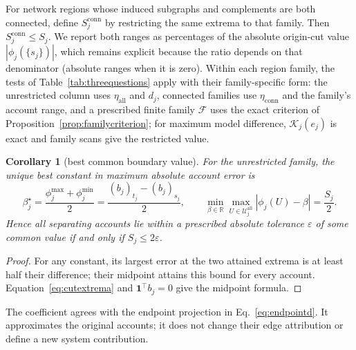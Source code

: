\documentclass[a4paper,fleqn]{cas-sc}
\newtheorem{corollary}[theorem]{Corollary}
\begin{document}
For network regions whose induced subgraphs and complements are both
connected, define $S_j^{\mathrm{conn}}$ by restricting the same extrema to
that family. Then $S_j^{\mathrm{conn}}\le S_j$. We report both
ranges as percentages of the absolute origin-cut value
$|\phi_j(\{s_j\})|$, which remains explicit because the ratio depends
on that denominator (absolute ranges when it is zero). Within each
region family, the tests of Table~\ref{tab:threequestions} apply with
their family-specific form: the unrestricted column uses
$\eta_{\mathrm{all}}$ and $d_j$, connected families use
$\eta_{\mathrm{conn}}$ and the family's account range, and a
prescribed finite family $\mathcal F$ uses the exact criterion of
Proposition~\ref{prop:familycriterion}; for
maximum model difference, $\mathcal K_j(e_j)$ is exact and family
scans give the restricted value.

\begin{corollary}[best common boundary value]\label{cor:approxinterchange}
For the unrestricted family, the unique best constant in maximum absolute
account error is
\[
\beta_j^\star=\frac{\phi_j^{\max}+\phi_j^{\min}}2
=\frac{(b_j)_{t_j}-(b_j)_{s_j}}2,\qquad
\min_{\beta\in\mathbb R}\max_{U\in\mathcal U_j^{\mathrm{all}}}
|\phi_j(U)-\beta|=\frac{S_j}{2}.
\]
Hence all separating accounts lie within a prescribed absolute tolerance
$\varepsilon$ of some common value if and only if $S_j\le2\varepsilon$.
\end{corollary}
\begin{proof}
For any constant, its largest error at the two attained extrema is at least
half their difference; their midpoint attains this bound for every account.
Equation~\eqref{eq:cutextrema} and $\mathbf1^\top b_j=0$ give the midpoint formula.
\end{proof}
The coefficient agrees with the endpoint projection in
Eq.~\eqref{eq:endpointd}. It approximates the original accounts; it does
not change their edge attribution or define a new system contribution.
\end{document}
